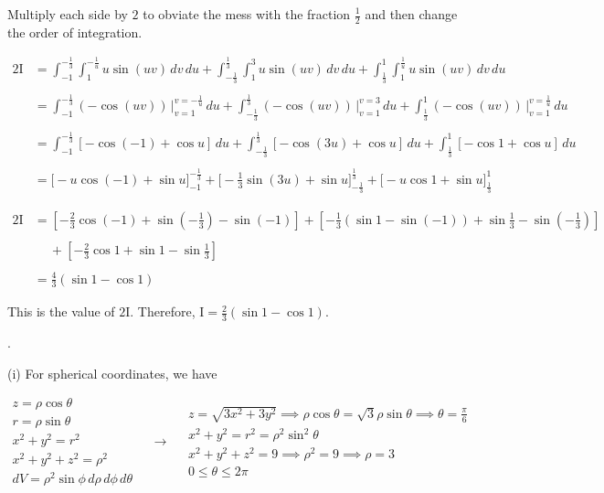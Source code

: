 \documentclass{article}
\begin{document}
\hfill

\noindent Multiply each side by $2$ to obviate the mess with the fraction $\displaystyle\frac12$ and then change the order of integration.

\begin{align*}
2\mathrm{I}&=\int_{-1}^{\textstyle-\frac13}\int_1^{\textstyle-\frac1u}u\sin(uv)\,dv\,du+\int_{\textstyle-\frac13}^{\textstyle\frac13}\int_1^3u\sin(uv)\,dv\,du+\int_{\textstyle\frac13}^1\int_1^{\textstyle\frac1u}u\sin(uv)\,dv\,du\\\\&=\int_{-1}^{\textstyle-\frac13}(-\cos(uv))\,\bigg|_{v=1}^{v=-\frac1u}\,du+\int_{\textstyle-\frac13}^{\textstyle\frac13}(-\cos(uv))\,\bigg|_{v=1}^{v=3}\,du+\int_{\textstyle\frac13}^1(-\cos(uv))\,\bigg|_{v=1}^{v=\frac1u}\,du\\\\&=\int_{-1}^{\textstyle-\frac13}[-\cos(-1)+\cos u]\,du+\int_{\textstyle-\frac13}^{\textstyle\frac13}[-\cos(3u)+\cos u]\,du+\int_{\textstyle\frac13}^1[-\cos1+\cos u]\,du\\\\&=\bigg[-u\cos(-1)+\sin u\bigg]_{-1}^{\textstyle-\frac13}+\bigg[-\frac13\sin(3u)+\sin u\bigg]_{\textstyle-\frac13}^{\textstyle\frac13}+\bigg[-u\cos1+\sin u\bigg]_{\textstyle\frac13}^1
\end{align*}

\begin{align*}
2\mathrm{I}&=\left[-\frac23\cos(-1)+\sin\left(-\frac13\right)-\sin(-1)\right]+\left[-\frac13\left(\sin1-\sin(-1)\right)+\sin\frac13-\sin\left(-\frac13\right)\right]\\\\&\quad\:+\left[-\frac23\cos1+\sin1-\sin\frac13\right]\\\\&=\frac43(\sin1-\cos1)
\end{align*}

\noindent This is the value of $2\mathrm{I}$. Therefore, $\boxed{\mathrm{I}=\frac23(\sin1-\cos1)}$.

\hfill

.

\hfill

\noindent (i) For spherical coordinates, we have

\[
\begin{array}{c}
z=\rho\cos\theta\\
r=\rho\sin\theta\\
x^2+y^2=r^2\\
x^2+y^2+z^2=\rho^2\\
dV=\rho^2\sin\phi\,d\rho\,d\phi\,d\theta
\end{array}\quad\rightarrow\quad
\begin{array}{c}
\displaystyle z=\sqrt{3x^2+3y^2}\implies\rho\cos\theta=\sqrt3\rho\sin\theta\implies\theta=\frac\pi6\\[0.2cm]
x^2+y^2=r^2=\rho^2\sin^2\theta\\[0.1cm]
x^2+y^2+z^2=9\implies\rho^2=9\implies\rho=3\\[0.1cm]
0\leq\theta\leq2\pi
\end{array}
\]
\end{document}
